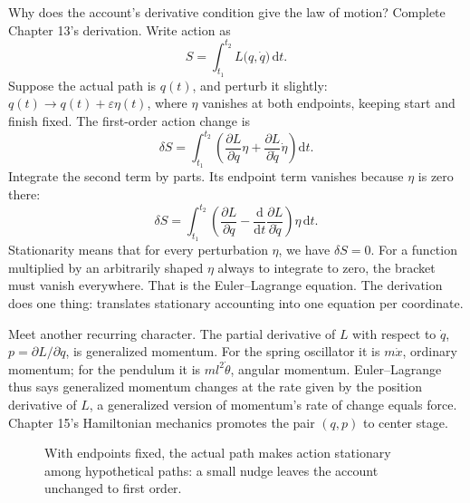 \begin{mathbridge}
Why does the account's derivative condition give the law of motion? Complete Chapter 13's derivation. Write action as
\[
S=\int_{t_1}^{t_2} L\bigl(q,\dot{q}\bigr)\,\mathrm{d}t .
\]
Suppose the actual path is \(q(t)\), and perturb it slightly: \(q(t)\to q(t)+\varepsilon\eta(t)\), where \(\eta\) vanishes at both endpoints, keeping start and finish fixed. The first-order action change is
\[
\delta S=\int_{t_1}^{t_2}\left(\frac{\partial L}{\partial q}\eta+\frac{\partial L}{\partial \dot q}\dot{\eta}\right)\mathrm{d}t .
\]
Integrate the second term by parts. Its endpoint term vanishes because \(\eta\) is zero there:
\[
\delta S=\int_{t_1}^{t_2}\left(\frac{\partial L}{\partial q}-\frac{\mathrm{d}}{\mathrm{d}t}\frac{\partial L}{\partial \dot q}\right)\eta\,\mathrm{d}t .
\]
Stationarity means that for every perturbation \(\eta\), we have \(\delta S=0\). For a function multiplied by an arbitrarily shaped \(\eta\) always to integrate to zero, the bracket must vanish everywhere. That is the Euler--Lagrange equation. The derivation does one thing: translates stationary accounting into one equation per coordinate.

Meet another recurring character. The partial derivative of \(L\) with respect to \(\dot{q}\), \(p=\partial L/\partial\dot{q}\), is generalized momentum. For the spring oscillator it is \(m\dot{x}\), ordinary momentum; for the pendulum it is \(ml^2\dot{\theta}\), angular momentum. Euler--Lagrange thus says generalized momentum changes at the rate given by the position derivative of \(L\), a generalized version of momentum's rate of change equals force. Chapter 15's Hamiltonian mechanics promotes the pair \((q,p)\) to center stage.
\end{mathbridge}

\begin{figure}[htbp]
\centering
{}
\caption{With endpoints fixed, the actual path makes action stationary among hypothetical paths: a small nudge leaves the account unchanged to first order.}
\end{figure}

